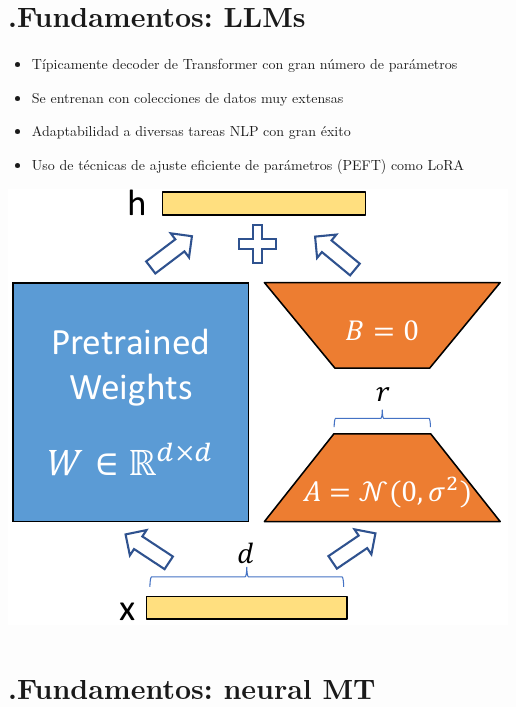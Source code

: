 \documentclass[landscape,spanish]{article}
\begin{document}
\cp %
\section*{\thesection.\quad Fundamentos: LLMs}
\vspace*{10mm}

\begin{itemize}\itemsep=10mm
    \item  Típicamente decoder de Transformer con gran número de parámetros

    \item  Se entrenan con colecciones de datos muy extensas

    \item  Adaptabilidad a diversas tareas NLP con gran éxito

    \item  Uso de técnicas de ajuste eficiente de parámetros (PEFT) como LoRA

\end{itemize}

\vspace*{10mm}
\centering
\includegraphics[scale=1.1]{lora.pdf}

\cp %
\section*{\thesection.\quad Fundamentos: neural MT}
\vspace*{10mm}
\end{document}
